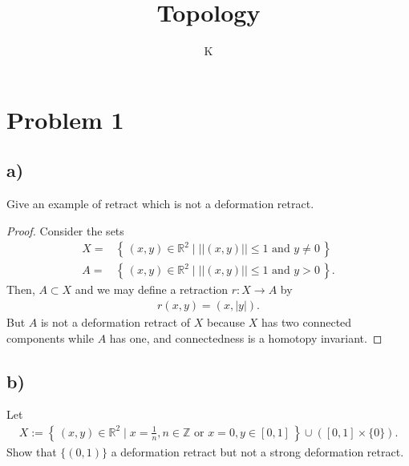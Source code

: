 \documentclass[a4paper]{article}
\title{Topology}
\author{K}
\theoremstyle{definition}
\newcommand{\makeset}[2]{\left\{\, #1 \mid #2 \,\right\}}
\begin{document}
\section*{Problem 1}
\subsection*{a)}
Give an example of retract which is not a deformation retract.
\begin{proof}
    Consider the sets
    \begin{align*}
        X =& \makeset{(x, y) \in \mathbb{R}^2}{||(x, y)|| \leq 1 \text{ and } y \neq 0} \\
        A =& \makeset{(x, y) \in \mathbb{R}^2}{||(x, y)|| \leq 1 \text{ and } y > 0} \text{.}
    \end{align*}
    Then, \(A \subset X\) and we may define a retraction \(r: X \longrightarrow A\) by
    \begin{align*}
        r(x, y) = (x, |y|) \text{.}
    \end{align*}
    But \(A\) is not a deformation retract of \(X\) because \(X\) has two connected components while \(A\) has one, and connectedness is a homotopy invariant.
    \end{proof}
    \subsection*{b)}
    Let
    \begin{align*}
        X := \makeset{(x, y) \in \mathbb{R}^2}{x = \frac{1}{n}, n \in \mathbb{Z} \text{ or } x = 0, y \in [0, 1]} \cup \left( [0, 1] \times \{0\} \right) \text{.}
    \end{align*}
    Show that \(\{(0, 1)\}\) a deformation retract but not a strong deformation retract.
\end{document}
